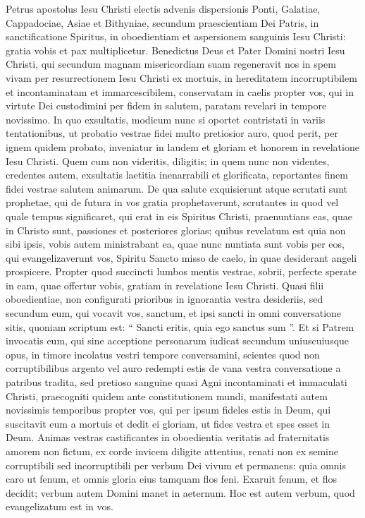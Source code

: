 \begin{biblechapter}
 \verse Petrus apostolus Iesu Christi electis advenis dispersionis Ponti, Galatiae, Cappadociae, Asiae et Bithyniae, 
\verse secundum praescientiam Dei Patris, in sanctificatione Spiritus, in oboedientiam et aspersionem sanguinis Iesu Christi: gratia vobis et pax multiplicetur.
 \verse Benedictus Deus et Pater Domini nostri Iesu Christi, qui secundum magnam misericordiam suam regeneravit nos in spem vivam per resurrectionem Iesu Christi ex mortuis, 
\verse in hereditatem incorruptibilem et incontaminatam et immarcescibilem, conservatam in caelis propter vos, 
\verse qui in virtute Dei custodimini per fidem in salutem, paratam revelari in tempore novissimo. 
\verse In quo exsultatis, modicum nunc si oportet contristati in variis tentationibus, 
 \verse ut probatio vestrae fidei multo pretiosior auro, quod perit, per ignem quidem probato, inveniatur in laudem et gloriam et honorem in revelatione Iesu Christi. 
\verse Quem cum non videritis, diligitis; in quem nunc non videntes, credentes autem, exsultatis laetitia inenarrabili et glorificata, 
\verse reportantes finem fidei vestrae salutem animarum.
 \verse De qua salute exquisierunt atque scrutati sunt prophetae, qui de futura in vos gratia prophetaverunt, 
\verse scrutantes in quod vel quale tempus significaret, qui erat in eis Spiritus Christi, praenuntians eas, quae in Christo sunt, passiones et posteriores glorias; 
\verse quibus revelatum est quia non sibi ipsis, vobis autem ministrabant ea, quae nunc nuntiata sunt vobis per eos, qui evangelizaverunt vos, Spiritu Sancto misso de caelo, in quae desiderant angeli prospicere.
 \verse Propter quod succincti lumbos mentis vestrae, sobrii, perfecte sperate in eam, quae offertur vobis, gratiam in revelatione Iesu Christi. 
\verse Quasi filii oboedientiae, non configurati prioribus in ignorantia vestra desideriis, 
 \verse sed secundum eum, qui vocavit vos, sanctum, et ipsi sancti in omni conversatione sitis, 
\verse quoniam scriptum est: “ Sancti eritis, quia ego sanctus sum ”. 
\verse Et si Patrem invocatis eum, qui sine acceptione personarum iudicat secundum uniuscuiusque opus, in timore incolatus vestri tempore conversamini, 
\verse scientes quod non corruptibilibus argento vel auro redempti estis de vana vestra conversatione a patribus tradita, 
\verse sed pretioso sanguine quasi Agni incontaminati et immaculati Christi, 
\verse praecogniti quidem ante constitutionem mundi, manifestati autem novissimis temporibus propter vos, 
\verse qui per ipsum fideles estis in Deum, qui suscitavit eum a mortuis et dedit ei gloriam, ut fides vestra et spes esset in Deum.
 \verse Animas vestras castificantes in oboedientia veritatis ad fraternitatis amorem non fictum, ex corde invicem diligite attentius, 
\verse renati non ex semine corruptibili sed incorruptibili per verbum Dei vivum et permanens: 
\verse quia
 omnis caro ut fenum,
 et omnis gloria eius tamquam flos feni.
 Exaruit fenum, et flos decidit;
 \verse verbum autem Domini manet in aeternum.
 Hoc est autem verbum, quod evangelizatum est in vos.
 

\end{biblechapter}
